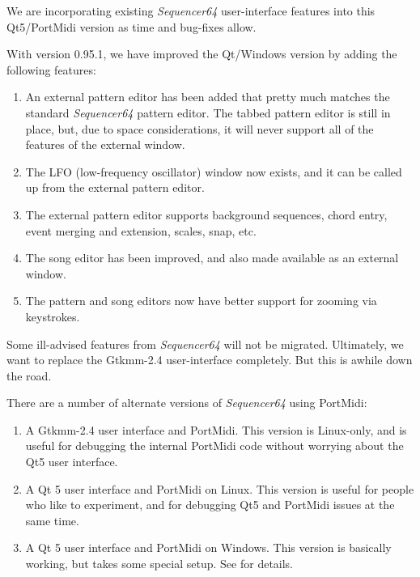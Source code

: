   We are incorporating existing \textsl{Sequencer64} user-interface
   features into this Qt5/PortMidi version as time and bug-fixes allow.

   With version 0.95.1, we have improved the Qt/Windows version by adding the
   following features:

   \begin{enumerate}
      \item An external pattern editor has been added that pretty much matches
         the standard \textsl{Sequencer64} pattern editor.  The tabbed
         pattern editor is still in place, but, due to space considerations,
         it will never support all of the features of the external window.
      \item The LFO (low-frequency oscillator) window now exists, and it can be
         called up from the external pattern editor.
      \item The external pattern editor supports background sequences, chord
         entry, event merging and extension, scales, snap, etc.
      \item The song editor has been improved, and also made available as an
         external window.
      \item The pattern and song editors now have better support for zooming
         via keystrokes.
   \end{enumerate}
   Some ill-advised features from \textsl{Sequencer64} will not be migrated.
   Ultimately, we want to replace the Gtkmm-2.4 user-interface completely.
   But this is awhile down the road.

   There are a number of alternate versions of \textsl{Sequencer64} using
   PortMidi:

   \begin{enumerate}
      \item A Gtkmm-2.4 user interface and PortMidi.  This version is
         Linux-only, and is useful for debugging the internal PortMidi code
         without worrying about the Qt5 user interface.
      \item A Qt 5 user interface and PortMidi on Linux.  This version is
         useful for people who like to experiment, and for debugging Qt5 and
         PortMidi issues at the same time.
      \item A Qt 5 user interface and PortMidi on Windows.  This version is
         basically working, but takes some special setup.
         See  for details.
   \end{enumerate}

